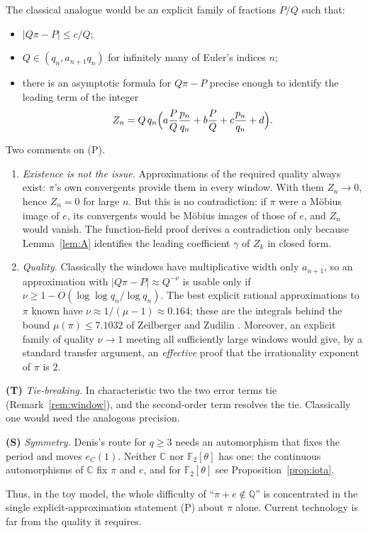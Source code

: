 \documentclass[11pt]{amsart}
\theoremstyle{remark}
\numberwithin{equation}{section}
\newcommand{\F}{\mathbb{F}}
\newcommand{\Q}{\mathbb{Q}}
\newcommand{\C}{\mathbb{C}}
\newcommand{\eC}{e_C}
\begin{document}
The classical analogue would be an explicit family of fractions $P/Q$ such that:
\begin{itemize}
\item $|Q\pi-P|\le c/Q$;
\item $Q\in(q_n,a_{n+1}q_n)$ for infinitely many of Euler's indices $n$;
\item there is an asymptotic formula for $Q\pi-P$ precise enough to identify the leading term of the integer
\[
Z_n=Q\,q_n\Bigl(a\frac PQ\frac{p_n}{q_n}+b\frac PQ+c\frac{p_n}{q_n}+d\Bigr).
\]
\end{itemize}
Two comments on (P).
\begin{enumerate}
\item[(1)] \emph{Existence is not the issue.} Approximations of the required quality always exist: $\pi$'s own convergents provide them in every window. With them $Z_n\to0$, hence $Z_n=0$ for large $n$. But this is no contradiction: if $\pi$ were a M\"obius image of $e$, its convergents would be M\"obius images of those of $e$, and $Z_n$ would vanish. The function-field proof derives a contradiction only because Lemma~\ref{lem:A} identifies the leading coefficient $\gamma$ of $Z_k$ in closed form.
\item[(2)] \emph{Quality.} Classically the windows have multiplicative width only $a_{n+1}$, so an approximation with $|Q\pi-P|\approx Q^{-\nu}$ is usable only if $\nu\ge1-O(\log\log q_n/\log q_n)$. The best explicit rational approximations to $\pi$ known have $\nu\approx1/(\mu-1)\approx0.164$; these are the integrals behind the bound $\mu(\pi)\le7.1032$ of Zeilberger and Zudilin \cite{ZZ20}. Moreover, an explicit family of quality $\nu\to1$ meeting all sufficiently large windows would give, by a standard transfer argument, an \emph{effective} proof that the irrationality exponent of $\pi$ is $2$.
\end{enumerate}

\smallskip\noindent\textbf{(T)} \emph{Tie-breaking.} In characteristic two the two error terms tie (Remark~\ref{rem:window}), and the second-order term resolves the tie. Classically one would need the analogous precision.

\smallskip\noindent\textbf{(S)} \emph{Symmetry.} Denis's route for $q\ge3$ needs an automorphism that fixes the period and moves $\eC(1)$. Neither $\C$ nor $\F_2[\theta]$ has one: the continuous automorphisms of $\C$ fix $\pi$ and $e$, and for $\F_2[\theta]$ see Proposition~\ref{prop:iota}.

\smallskip
Thus, in the toy model, the whole difficulty of ``$\pi+e\notin\Q$'' is concentrated in the single explicit-approximation statement (P) about $\pi$ alone. Current technology is far from the quality it requires.
\end{document}
